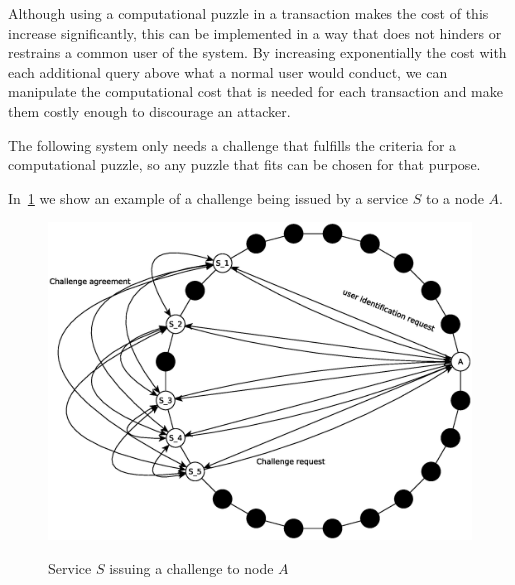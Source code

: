 
Although using a computational puzzle in a transaction makes the cost of this
increase significantly, this can be implemented in a way that does not hinders
or restrains a common user of the system.
By increasing exponentially the cost with each additional
query above what a normal user would conduct, we can manipulate the computational cost that is needed for each
transaction and make them costly enough to discourage an attacker.





 The following system only needs a challenge that fulfills the
criteria for a computational puzzle, so any puzzle that fits can be chosen for
that purpose.

In~\ref{fig:challenge} we show an example of a challenge being issued by a
service $S$ to a node $A$.

\begin{figure}[!htb]
\centering
\includegraphics[width=14cm]{../img/challenge}\\
\caption{Service $S$ issuing a  challenge to node $A$}
\label{fig:challenge}
\end{figure}

